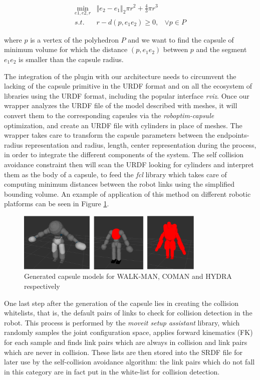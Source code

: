 \begin{eqnarray*}
\min_{e1,e2,r} & \left\Vert e_2 - e_1 \right\Vert_2 \pi r^2+\frac{4}{3}\pi r^3\\
{s.t.}  & r-d(p,e_1e_2) \ge 0, & \vee p \in P
\end{eqnarray*}

where $p$ is a vertex of the polyhedron $P$ and we want to find the capsule of minimum volume for which the distance $(p,e_1e_2)$ between $p$ and the segment $e_1e_2$ is smaller than the capsule radius.

The integration of the plugin with our architecture needs to circumvent the lacking of the capsule primitive in the URDF format and on all the ecosystem of libraries using the URDF format, including the popular interface \emph{rviz}.
Once our wrapper analyzes the URDF file of the model described with meshes, it will convert them to the corresponding capsules via the \emph{roboptim-capsule} optimization, and create an URDF file with cylinders in place of meshes. The wrapper takes care to transform the capsule parameters between the endpoints-radius representation and radius, length, center representation during the process, in order to integrate the different components of the system.
The self collision avoidance constraint then will scan the URDF looking for cylinders and interpret them as the body of a capsule, to feed the \emph{fcl} library which takes care of computing minimum distances between the robot links using the simplified bounding volume. 
An example of application of this method on different robotic platforms can be seen in Figure \ref{fig:capsules}.
\begin{figure}
\vspace{2 mm}
\centering \includegraphics[width=0.8\textwidth]{images/software/robots_capsules.eps} 
\caption{Generated capsule models for WALK-MAN, COMAN and HYDRA respectively} 
\label{fig:capsules}
\end{figure}
One last step after the generation of the capsule lies in creating the collision whitelists, that is, the default pairs of links to check for collision detection in the robot. This process is performed by the \emph{moveit setup assistant}\cite{Coleman2014-bd} library, which randomly samples the joint configuration space, applies forward kinematics (FK) for each sample and finds link pairs which are always in collision and link pairs which are never in collision. These lists are then stored into the SRDF file for later use by the self-collision avoidance algorithm: the link pairs which do not fall in this category are in fact put in the white-list for collision detection.

